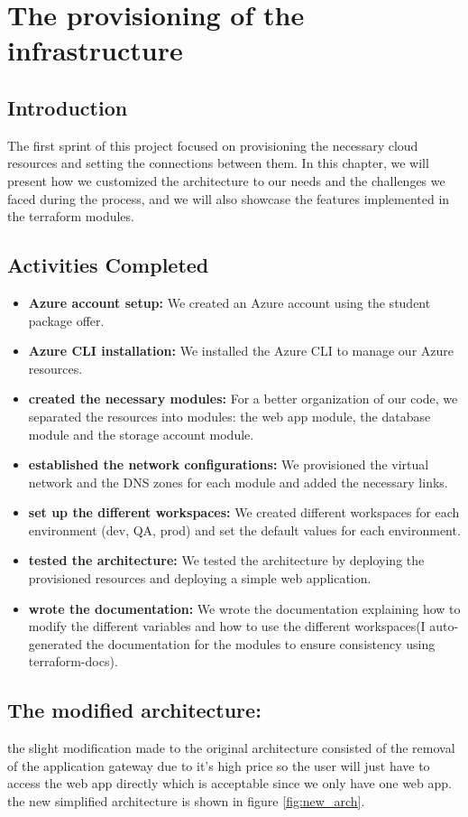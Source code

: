 \chapter{The provisioning of the infrastructure}

\section*{Introduction}
\noindent
The first sprint of this project focused on provisioning the necessary cloud resources and setting the connections between them. In this chapter, we will present how we customized the architecture to our needs and the challenges we faced during the process, and we will also showcase the features implemented in the terraform modules.

\section{Activities Completed}
\begin{itemize}
    \item \textbf{Azure account setup:} We created an Azure account using the student package offer.
    \item \textbf{Azure CLI installation:} We installed the Azure CLI to manage our Azure resources.
    \item \textbf{created the necessary modules:} For a better organization of our code, we separated the resources into modules: the web app module, the database module and the storage account module.
    \item \textbf{established the network configurations:} We provisioned the virtual network and the DNS zones for each module and added the necessary links.
    \item \textbf{set up the different workspaces:} We created different workspaces for each environment (dev, QA, prod) and set the default values for each environment.
    \item \textbf{tested the architecture:} We tested the architecture by deploying the provisioned resources and deploying a simple web application.
    \item \textbf{wrote the documentation:} We wrote the documentation explaining how to modify the different variables and how to use the different workspaces(I auto-generated the documentation for the modules to ensure consistency using terraform-docs).
\end{itemize}
\section{The modified architecture:}
the slight modification made to the original architecture consisted of the removal of the application gateway due to it's high price so the user will just have to access the web app directly which is acceptable since we only have one web app.
\\ the new simplified architecture is shown in figure \ref{fig:new_arch}.


